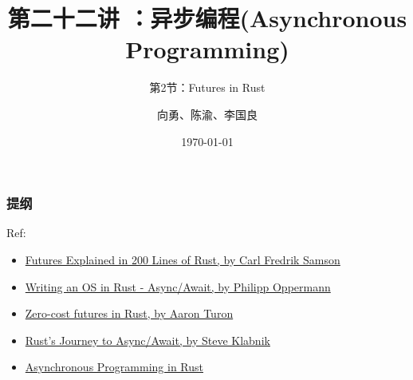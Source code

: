 


\title[第22讲]{第二十二讲 ：异步编程(Asynchronous Programming)} %
\subtitle{第2节：Futures in Rust}
\author{向勇、陈渝、李国良} %
\date{\today} %


\begin{frame}
\titlepage %
\end{frame}

\begin{frame}
\frametitle{提纲} %
\tableofcontents %

\tiny
Ref:
\begin{itemize}
	\item \href{https://cfsamson.github.io/books-futures-explained/}{Futures Explained in 200 Lines of Rust, by Carl Fredrik Samson}
	\item \href{https://os.phil-opp.com/async-await/}{Writing an OS in Rust - Async/Await, by Philipp Oppermann}
	\item \href{https://aturon.github.io/tech/2016/08/11/futures/}{Zero-cost futures in Rust, by Aaron Turon}
	\item \href{https://www.infoq.com/presentations/rust-2019/}{Rust’s Journey to Async/Await, by Steve Klabnik}
	\item \href{https://rust-lang.github.io/async-book/index.html}{Asynchronous Programming in Rust}
\end{itemize}


\end{frame}
